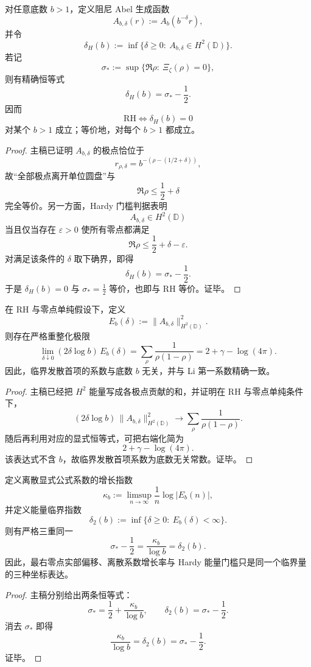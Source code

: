 \begin{theorem}\label{thm:conclusion-hardy-damping-critical-exponent-exact-shift}
对任意底数 \(b>1\)，定义阻尼 Abel 生成函数
\[
A_{b,\delta}(r):=A_b(b^{-\delta}r),
\]
并令
\[
\delta_H(b):=\inf\{\delta\ge 0:\ A_{b,\delta}\in H^2(\mathbb D)\}.
\]
若记
\[
\sigma_*:=\sup\{\Re\rho:\ \Xi_\zeta(\rho)=0\},
\]
则有精确恒等式
\[
\delta_H(b)=\sigma_*-\frac12.
\]
因而
\[
\mathrm{RH}
\iff
\delta_H(b)=0
\]
对某个 \(b>1\) 成立；等价地，对每个 \(b>1\) 都成立。
\end{theorem}
\begin{proof}
主稿已证明 \(A_{b,\delta}\) 的极点恰位于
\[
r_{\rho,\delta}=b^{-(\rho-(1/2+\delta))},
\]
故“全部极点离开单位圆盘”与
\[
\Re\rho\le \frac12+\delta
\]
完全等价。另一方面，Hardy 门槛判据表明
\[
A_{b,\delta}\in H^2(\mathbb D)
\]
当且仅当存在 \(\varepsilon>0\) 使所有零点都满足
\[
\Re\rho\le \frac12+\delta-\varepsilon.
\]
对满足该条件的 \(\delta\) 取下确界，即得
\[
\delta_H(b)=\sigma_*-\frac12.
\]
于是 \(\delta_H(b)=0\) 与 \(\sigma_*=\tfrac12\) 等价，也即与 RH 等价。证毕。
\end{proof}

\begin{theorem}[Li 第一常数的底数无关能量律]\label{thm:conclusion-li-first-constant-base-independent-energy-law}
在 RH 与零点单纯假设下，定义
\[
E_b(\delta):=\|A_{b,\delta}\|_{H^2(\mathbb D)}^2.
\]
则存在严格重整化极限
\[
\lim_{\delta\downarrow 0}(2\delta\log b)\,E_b(\delta)
=
\sum_{\rho}\frac{1}{\rho(1-\rho)}
=
2+\gamma-\log(4\pi).
\]
因此，临界发散首项的系数与底数 \(b\) 无关，并与 Li 第一系数精确一致。
\end{theorem}
\begin{proof}
主稿已经把 \(H^2\) 能量写成各极点贡献的和，并证明在 RH 与零点单纯条件下，
\[
(2\delta\log b)\,\|A_{b,\delta}\|_{H^2(\mathbb D)}^2
\longrightarrow
\sum_{\rho}\frac{1}{\rho(1-\rho)}.
\]
随后再利用对应的显式恒等式，可把右端化简为
\[
2+\gamma-\log(4\pi).
\]
该表达式不含 \(b\)，故临界发散首项系数为底数无关常数。证毕。
\end{proof}

\begin{theorem}\label{thm:conclusion-growth-hardy-threshold-rightmost-zero-triple-identity}
定义离散显式公式系数的增长指数
\[
\kappa_b:=\limsup_{n\to\infty}\frac{1}{n}\log|E_b(n)|,
\]
并定义能量临界指数
\[
\delta_2(b):=\inf\{\delta\ge 0:\ E_b(\delta)<\infty\}.
\]
则有严格三重同一
\[
\sigma_*-\frac12
=
\frac{\kappa_b}{\log b}
=
\delta_2(b).
\]
因此，最右零点实部偏移、离散系数增长率与 Hardy 能量门槛只是同一个临界量的三种坐标表达。
\end{theorem}
\begin{proof}
主稿分别给出两条恒等式：
\[
\sigma_*=\frac12+\frac{\kappa_b}{\log b},
\qquad
\delta_2(b)=\sigma_*-\frac12.
\]
消去 \(\sigma_*\) 即得
\[
\frac{\kappa_b}{\log b}=\delta_2(b)=\sigma_*-\frac12.
\]
证毕。
\end{proof}

